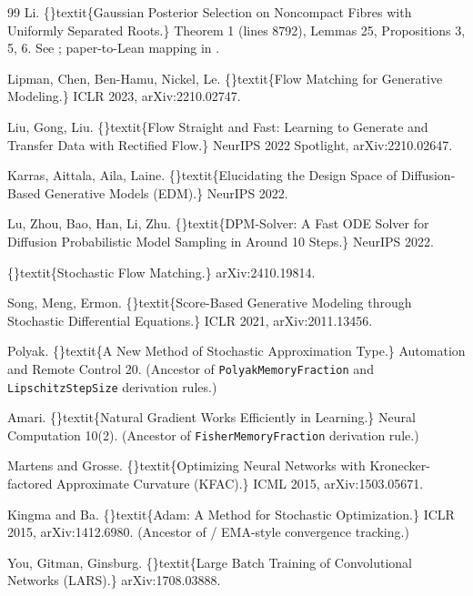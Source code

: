 \documentclass{article}
\begin{document}
\begin{thebibliography}{99}
 Li. \{\}textit\{Gaussian Posterior Selection on Noncompact Fibres with Uniformly Separated Roots.\} Theorem 1 (lines 8792), Lemmas 25, Propositions 3, 5, 6. See ; paper-to-Lean mapping in .

 Lipman, Chen, Ben-Hamu, Nickel, Le. \{\}textit\{Flow Matching for Generative Modeling.\} ICLR 2023, arXiv:2210.02747.

 Liu, Gong, Liu. \{\}textit\{Flow Straight and Fast: Learning to Generate and Transfer Data with Rectified Flow.\} NeurIPS 2022 Spotlight, arXiv:2210.02647.

 Karras, Aittala, Aila, Laine. \{\}textit\{Elucidating the Design Space of Diffusion-Based Generative Models (EDM).\} NeurIPS 2022.

 Lu, Zhou, Bao, Han, Li, Zhu. \{\}textit\{DPM-Solver: A Fast ODE Solver for Diffusion Probabilistic Model Sampling in Around 10 Steps.\} NeurIPS 2022.

 \{\}textit\{Stochastic Flow Matching.\} arXiv:2410.19814.

 Song, Meng, Ermon. \{\}textit\{Score-Based Generative Modeling through Stochastic Differential Equations.\} ICLR 2021, arXiv:2011.13456.

 Polyak. \{\}textit\{A New Method of Stochastic Approximation Type.\} Automation and Remote Control 20. (Ancestor of \texttt{PolyakMemoryFraction} and \texttt{LipschitzStepSize} derivation rules.)

 Amari. \{\}textit\{Natural Gradient Works Efficiently in Learning.\} Neural Computation 10(2). (Ancestor of \texttt{FisherMemoryFraction} derivation rule.)

 Martens and Grosse. \{\}textit\{Optimizing Neural Networks with Kronecker-factored Approximate Curvature (KFAC).\} ICML 2015, arXiv:1503.05671.

 Kingma and Ba. \{\}textit\{Adam: A Method for Stochastic Optimization.\} ICLR 2015, arXiv:1412.6980. (Ancestor of / EMA-style convergence tracking.)

 You, Gitman, Ginsburg. \{\}textit\{Large Batch Training of Convolutional Networks (LARS).\} arXiv:1708.03888.


\end{thebibliography}
\end{document}
